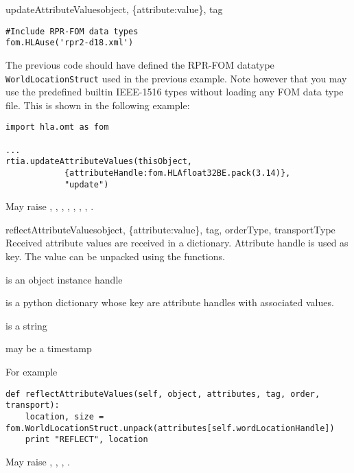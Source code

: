 \begin{methoddesc}[rtia]{updateAttributeValues}{object, \{attribute:value\},
tag}
\begin{verbatim}
#Include RPR-FOM data types
fom.HLAuse('rpr2-d18.xml')
\end{verbatim}
The previous code should have defined the RPR-FOM datatype
\texttt{WorldLocationStruct} used in the previous example.
Note however that you may use the predefined builtin IEEE-1516
types without loading any FOM data type file.
This is shown in the following example:
\begin{verbatim}
import hla.omt as fom

...
rtia.updateAttributeValues(thisObject,
            {attributeHandle:fom.HLAfloat32BE.pack(3.14)},
            "update")
\end{verbatim}

May raise
,
,
,
,
,
,
,
.
\end{methoddesc}

\begin{methoddesc}{reflectAttributeValues}{object, \{attribute:value\}, tag, orderType, transportType}
Received attribute values are received in a dictionary. Attribute handle is used as key.
The value can be unpacked using the  functions.
\begin{description}
\item {} is an object instance handle 
\item \item {} is a python dictionary whose key are attribute
handles with associated values.
\item {} is a string
\item {}
\item {}
\item {} may be a timestamp
\item {}
\end{description}

For example
\begin{verbatim}
def reflectAttributeValues(self, object, attributes, tag, order, transport):
    location, size = fom.WorldLocationStruct.unpack(attributes[self.wordLocationHandle])
    print "REFLECT", location
\end{verbatim}

May raise
,
,
,
.
\end{methoddesc}


